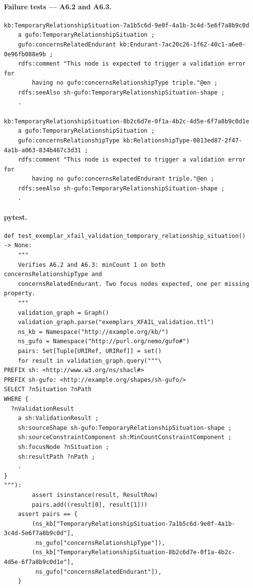 \documentclass[12pt,a4paper]{article}
\begin{document}
\paragraph{Failure tests --- A6.2 and A6.3.}

\begin{lstlisting}[style=turtlestyle]
kb:TemporaryRelationshipSituation-7a1b5c6d-9e0f-4a1b-3c4d-5e6f7a8b9c0d
    a gufo:TemporaryRelationshipSituation ;
    gufo:concernsRelatedEndurant kb:Endurant-7ac20c26-1f62-40c1-a6e0-0e96fb088e9b ;
    rdfs:comment "This node is expected to trigger a validation error for
        having no gufo:concernsRelationshipType triple."@en ;
    rdfs:seeAlso sh-gufo:TemporaryRelationshipSituation-shape ;
    .

kb:TemporaryRelationshipSituation-8b2c6d7e-0f1a-4b2c-4d5e-6f7a8b9c0d1e
    a gufo:TemporaryRelationshipSituation ;
    gufo:concernsRelationshipType kb:RelationshipType-0813ed87-2f47-4a1b-a063-834b467c3d31 ;
    rdfs:comment "This node is expected to trigger a validation error for
        having no gufo:concernsRelatedEndurant triple."@en ;
    rdfs:seeAlso sh-gufo:TemporaryRelationshipSituation-shape ;
    .
\end{lstlisting}

\paragraph{pytest.}

\begin{lstlisting}[style=pythonstyle]
def test_exemplar_xfail_validation_temporary_relationship_situation() -> None:
    """
    Verifies A6.2 and A6.3: minCount 1 on both concernsRelationshipType and
    concernsRelatedEndurant. Two focus nodes expected, one per missing property.
    """
    validation_graph = Graph()
    validation_graph.parse("exemplars_XFAIL_validation.ttl")
    ns_kb = Namespace("http://example.org/kb/")
    ns_gufo = Namespace("http://purl.org/nemo/gufo#")
    pairs: Set[Tuple[URIRef, URIRef]] = set()
    for result in validation_graph.query("""\
PREFIX sh: <http://www.w3.org/ns/shacl#>
PREFIX sh-gufo: <http://example.org/shapes/sh-gufo/>
SELECT ?nSituation ?nPath
WHERE {
  ?nValidationResult
    a sh:ValidationResult ;
    sh:sourceShape sh-gufo:TemporaryRelationshipSituation-shape ;
    sh:sourceConstraintComponent sh:MinCountConstraintComponent ;
    sh:focusNode ?nSituation ;
    sh:resultPath ?nPath ;
    .
}
"""):
        assert isinstance(result, ResultRow)
        pairs.add((result[0], result[1]))
    assert pairs == {
        (ns_kb["TemporaryRelationshipSituation-7a1b5c6d-9e0f-4a1b-3c4d-5e6f7a8b9c0d"],
         ns_gufo["concernsRelationshipType"]),
        (ns_kb["TemporaryRelationshipSituation-8b2c6d7e-0f1a-4b2c-4d5e-6f7a8b9c0d1e"],
         ns_gufo["concernsRelatedEndurant"]),
    }
\end{lstlisting}
\end{document}
